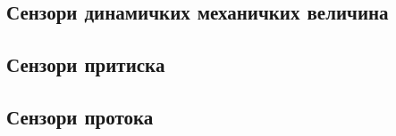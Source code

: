 \setcounter{fid}{0}
\graphicspath{{./4_senzori/1_meh/}}
\noindent

\vspace*{\ProblemSep}
\goodbreak
\subsection{Сензори динамичких механичких величина}


\setcounter{fid}{0}
\graphicspath{{./4_senzori/2_din_meh/}}
\noindent

\vspace*{\ProblemSep}
\goodbreak
\subsection{Сензори притиска}


\setcounter{fid}{0}
\graphicspath{{./4_senzori/3_pritisak/}}
\noindent

\vspace*{\ProblemSep}
\goodbreak


\setcounter{fid}{0}
\graphicspath{{./4_senzori/3_pritisak/}}
\noindent

\vspace*{\ProblemSep}
\goodbreak


\setcounter{fid}{0}
\graphicspath{{./4_senzori/3_pritisak/}}
\noindent

\vspace*{\ProblemSep}
\goodbreak
\subsection{Сензори протока}


\setcounter{fid}{0}
\graphicspath{{./4_senzori/4_protok/}}
\noindent

\vspace*{\ProblemSep}
\goodbreak


\setcounter{fid}{0}
\graphicspath{{./4_senzori/4_protok/}}
\noindent

\vspace*{\ProblemSep}
\goodbreak


\setcounter{fid}{0}
\graphicspath{{./4_senzori/4_protok/}}
\noindent

\vspace*{\ProblemSep}
\goodbreak


\setcounter{fid}{0}
\graphicspath{{./4_senzori/4_protok/}}
\noindent

\vspace*{\ProblemSep}
\goodbreak
\appendix
